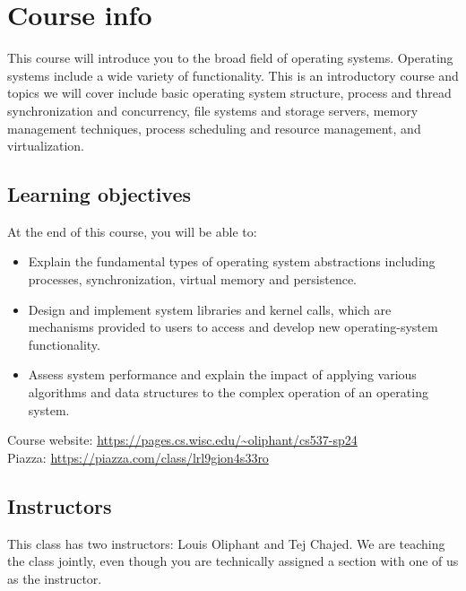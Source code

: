 \maketitle

\section*{Course info}

This course will introduce you to the broad field of operating systems.
Operating systems include a wide variety of functionality. This is an
introductory course and topics we will cover include basic operating system
structure, process and thread synchronization and concurrency, file systems and
storage servers, memory management techniques, process scheduling and resource
management, and virtualization.

\subsection*{Learning objectives}

At the end of this course, you will be able to:

\begin{itemize}[noitemsep]
  \item Explain the fundamental types of operating system abstractions including
        processes, synchronization, virtual memory and persistence.
  \item Design and implement system libraries and kernel calls, which are
        mechanisms provided to users to access and develop new operating-system
        functionality.
  \item Assess system performance and explain the impact of applying various
        algorithms and data structures to the complex operation of an operating system.
\end{itemize}

Course website: \url{https://pages.cs.wisc.edu/~oliphant/cs537-sp24} \\
Piazza: \url{https://piazza.com/class/lrl9gion4s33ro}

\subsection*{Instructors}
This class has two instructors: Louis Oliphant and Tej Chajed. We are teaching
the class jointly, even though you are technically assigned a section with one
of us as the instructor.

